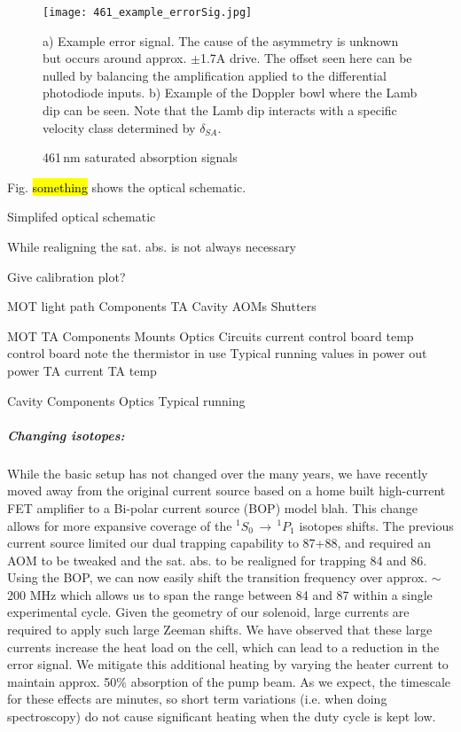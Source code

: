 	\begin{figure}
		\centerline{
		\texttt{[image: 461\_example\_errorSig.jpg]}}
		\caption{461\,nm saturated absorption signals}{a) Example error signal. The cause of the asymmetry is unknown but occurs around approx. $\pm$1.7A drive. The offset seen here can be nulled by balancing the amplification applied to the differential photodiode inputs. b) Example of the Doppler bowl where the Lamb dip can be seen. Note that the Lamb dip interacts with a specific velocity class determined by $\delta_{SA}$.}
		\label{fig:461zeemanBeam}
	\end{figure}

Fig. \hl{something} shows the optical schematic.



Simplifed optical schematic

While realigning the sat. abs. is not always necessary

Give calibration plot?

MOT light path
	Components
		TA
		Cavity
		AOMs
		Shutters
	
	MOT TA
		Components
			Mounts
			Optics
			Circuits
				current control board
				temp control board
					note the thermistor in use
		Typical running values
			in power
			out power
			TA current
			TA temp
		
	Cavity
		Components
			Optics
		Typical running
		
\subparagraph{Changing isotopes:} \label{para:change_iso}
While the basic setup has not changed over the many years, we have recently moved away from the original current source based on a home built high-current FET amplifier to a Bi-polar current source (BOP) model blah. 
This change allows for more expansive coverage of the $^1S_0\,\rightarrow\,^1P_1$ isotopes shifts. The previous current source limited our dual trapping capability to 87+88, and required an AOM to be tweaked and the sat. abs. to be realigned for trapping 84 and 86. 
Using the BOP, we can now easily shift the transition frequency over approx. $\sim$200 MHz which allows us to span the range between 84 and 87 within a single experimental cycle.
Given the geometry of our solenoid, large currents are required to apply such large Zeeman shifts.
We have observed that these large currents increase the heat load on the cell, which can lead to a reduction in the error signal.
We mitigate this additional heating by varying the heater current to maintain approx. 50\% absorption of the pump beam.
As we expect, the timescale for these effects are minutes, so short term variations (i.e. when doing spectroscopy) do not cause significant heating when the duty cycle is kept low.

